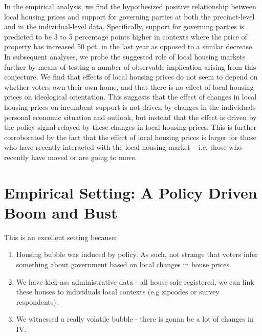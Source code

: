 \documentclass[12pt,a4paper]{article}
\begin{document}
In the empirical analysis, we find the hypothesized positive relationship between local housing prices and support for governing parties at both the precinct-level and in the individual-level data. Specifically, support for governing parties is predicted to be 3 to 5 percentage points higher in contexts where the price of property has increased 50 pct. in the last year as opposed to a similar decrease. In subsequent analyses, we probe the suggested role of local housing markets further by means of testing a number of observable implication arising from this conjecture. We find that effects of local housing prices do not seem to depend on whether voters own their own home, and that there is no effect of local housing prices on ideological orientation. This suggests that the effect of changes in local housing prices on incumbent support is not driven by changes in the individuals personal economic situation and outlook, but instead that the effect is driven by the policy signal relayed by these changes in local housing prices. This is further corroborated by the fact that the effect of local housing prices is larger for those who have recently interacted with the local housing market -- i.e. those who recently have moved or are going to move.


\section{Empirical Setting: A Policy Driven Boom and Bust}

This is an excellent setting because: 

\begin{enumerate}
	\item Housing bubble was induced by policy. As such, not strange that voters infer something about government based on local changes in house prices.
	\item We have kick-ass administrative data - all house sale registered, we can link these houses to individuals local contexts (e.g zipcodes or survey respondents).
	\item We witnessed a really volatile bubble - there is gonna be a lot of changes in IV.
\end{enumerate}


\end{document}
